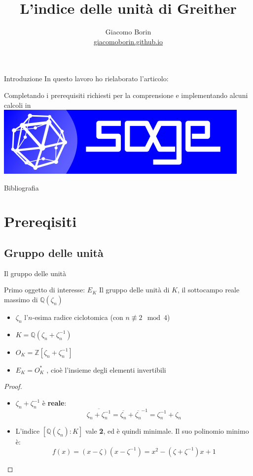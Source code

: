 \documentclass{beamer}
\title{L’indice delle unità di Greither}
\author{Giacomo Borin\\ \href{giacomoborin.github.io}{giacomoborin.github.io}}
\institute{Dipartimento di Matematica}
\newcommand{\mybibexclude}[1]{\addtocategory{fullcited}{#1}}
\theoremstyle{plain}
\theoremstyle{remark}
\theoremstyle{definition}
\newcommand{\sage}{\href{https://www.sagemath.org}{\includegraphics[height=\fontcharht\font`\B]{../images/sage.png} }}
\newcommand{\noqed}{\let\qed\relax}
\newcommand{\Z}{\mathbb{Z}}
\newcommand{\Q}{\mathbb{Q}}
\begin{document}
	\begin{frame}[plain]
	    \maketitle
	\end{frame}
	
	\begin{frame}{Introduzione}
		In questo lavoro ho rielaborato l'articolo:
		\begin{exampleblock}{}
			 \mybibexclude{GRE}
		\end{exampleblock}	
		\pause
		Completando i prerequisiti richiesti per la comprensione e implementando alcuni calcoli in \sage
	\end{frame}
	
	\begin{frame}[allowframebreaks]{Bibliografia}
			\printbibliography[heading=none, notcategory=fullcited]
	\end{frame}
	

	
\section{Prereqisiti}
\subsection{Gruppo delle unità}
	\begin{frame}{Il gruppo delle unità}
		\begin{block}{Primo oggetto di interesse: $ E_K $}
			Il gruppo delle unità di $ K $, il sottocampo reale massimo di $ \Q (\zeta_n )  $
		\end{block}
		\pause
		\begin{itemize}
			\item $ \zeta_n $  l'$ n $-esima radice ciclotomica (con $ n \not \equiv 2 \mod 4 $) \pause
			\item $ K = \Q (\zeta_n + \zeta_n^{-1})$ \pause
			\item $ O_K = \Z[\zeta_n + \zeta_n^{-1}] $ \pause
			\item $ E_K = O _K ^\ast$ , cioè l'insieme degli elementi invertibili 
		\end{itemize}
		\hyperlink{skip1}{ }
	\end{frame}
	
	\begin{frame}
		\begin{proof} \noqed
			\begin{itemize}
			\item $  \zeta_n + \zeta_n^{-1}  $ è \textbf{reale}:
			\[ \overline{\zeta_n + \zeta_n^{-1}} = \overline{\zeta_n} + \overline{\zeta_n}^{-1} = \zeta_n^{-1} + \zeta_n \] \pause
			\item L'indice $ [\Q(\zeta_n) : K] $ vale \textbf{2}, ed è quindi minimale. \pause 
			Il suo polinomio minimo è: 
			\[ f(x) = (x-\zeta)(x- \zeta^{-1}) = x^2 - (\zeta + \zeta ^{-1})x +1   \]
			\end{itemize}
		\end{proof}
	\end{frame}
	
\end{document}

